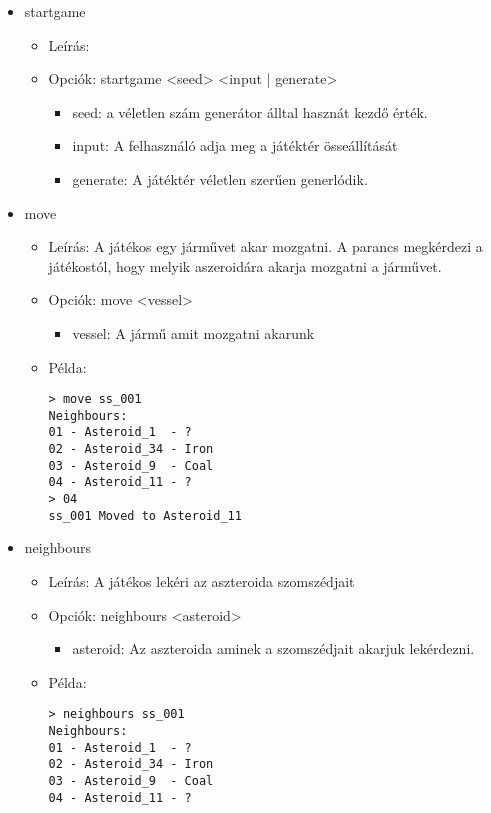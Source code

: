 \documentclass[../../projlab]{subfiles}
\begin{document}
\begin{itemize}
    \item startgame
    \begin{itemize}
        \item Leírás: 
        \item Opciók: startgame <seed> <input | generate>
        \begin{itemize}
            \item seed: a véletlen szám generátor álltal hasznát kezdő érték.
            \item input: A felhasználó adja meg a játéktér össeállítását
            \item generate: A játéktér véletlen szerűen generlódik.
        \end{itemize}
    \end{itemize}

    \item move
    \begin{itemize}
        \item Leírás: A játékos egy járművet akar mozgatni. \newline
            A parancs megkérdezi a játékostól, hogy melyik aszeroidára akarja mozgatni a járművet.
        \item Opciók: move <vessel>
        \begin{itemize}
            \item vessel: A jármű amit mozgatni akarunk
        \end{itemize}
        \item Példa:
            \begin{verbatim}
> move ss_001
Neighbours:
01 - Asteroid_1  - ?
02 - Asteroid_34 - Iron
03 - Asteroid_9  - Coal
04 - Asteroid_11 - ?
> 04
ss_001 Moved to Asteroid_11
            \end{verbatim}
    \end{itemize}


    \item neighbours
    \begin{itemize}
        \item Leírás: A játékos lekéri az aszteroida szomszédjait
        \item Opciók: neighbours <asteroid>
        \begin{itemize}
            \item asteroid: Az aszteroida aminek a szomszédjait akarjuk lekérdezni.
        \end{itemize}
        \item Példa:
            \begin{verbatim}
> neighbours ss_001
Neighbours:
01 - Asteroid_1  - ?
02 - Asteroid_34 - Iron
03 - Asteroid_9  - Coal
04 - Asteroid_11 - ?
            \end{verbatim}
    \end{itemize}



\end{itemize}
\end{document}
